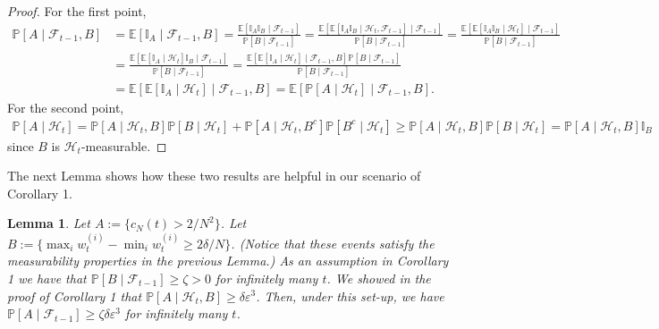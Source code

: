 \documentclass{article}
\newtheorem{lemma}{Lemma}
\newcommand{\PR}{\mathbb{P}}
\newcommand{\E}{\mathbb{E}}
\newcommand{\1}[1]{\mathbb{I}_{#1}}
\begin{document}
\begin{proof}
For the first point,
\begin{align*}
\PR[A \mid \mathcal{F}_{t-1}, B] 
&= \E[ \1{A} \mid \mathcal{F}_{t-1}, B]
= \frac{\E[ \1{A} \1{B} \mid \mathcal{F}_{t-1}]}{\PR[B \mid \mathcal{F}_{t-1}]}
=\frac{\E[ \E[ \1{A} \1{B} \mid \mathcal{H}_t, \mathcal{F}_{t-1} ] \mid \mathcal{F}_{t-1}]}{\PR[B \mid \mathcal{F}_{t-1}]}
=\frac{\E[ \E[ \1{A} \1{B} \mid \mathcal{H}_t ] \mid \mathcal{F}_{t-1}]}{\PR[B \mid \mathcal{F}_{t-1}]}\\
&=\frac{\E[ \E[ \1{A} \mid \mathcal{H}_t ] \1{B} \mid \mathcal{F}_{t-1}]}{\PR[B \mid \mathcal{F}_{t-1}]}
=\frac{\E[ \E[ \1{A} \mid \mathcal{H}_t ] \mid \mathcal{F}_{t-1}, B ] \PR[B \mid \mathcal{F}_{t-1}]}{\PR[B \mid \mathcal{F}_{t-1}]} \\
&=\E[ \E[ \1{A} \mid \mathcal{H}_t ] \mid \mathcal{F}_{t-1}, B ] 
=\E[ \PR[ A \mid \mathcal{H}_t] \mid \mathcal{F}_{t-1}, B ].
\end{align*}
For the second point,
\begin{align*}
\PR[A \mid \mathcal{H}_t] 
=  \PR[ A \mid \mathcal{H}_t, B] \PR[B \mid \mathcal{H}_t]
+ \PR[ A \mid \mathcal{H}_t, B^c] \PR[B^c \mid \mathcal{H}_t]
\geq  \PR[ A \mid \mathcal{H}_t, B] \PR[B \mid \mathcal{H}_t]
=  \PR[ A \mid \mathcal{H}_t, B] \1{B}
\end{align*}
since $B$ is $\mathcal{H}_t$-measurable.
\end{proof}

The next Lemma shows how these two results are helpful in our scenario of Corollary 1.

\begin{lemma}
Let $A := \{ c_N(t) > 2/N^2 \}$. Let $B:= \{ \max_i w_t^{(i)} - \min_i w_t^{(i)} \geq 2\delta/N \}$. (Notice that these events satisfy the measurability properties in the previous Lemma.)
As an assumption in Corollary 1 we have that $\PR[B \mid \mathcal{F}_{t-1}] \geq \zeta >0$ for infinitely many $t$.
We showed in the proof of Corollary 1 that $\PR[A \mid \mathcal{H}_t, B] \geq \delta\varepsilon^3$.
Then, under this set-up, we have
$\PR[A \mid \mathcal{F}_{t-1}] \geq \zeta\delta\varepsilon^3$ for infinitely many $t$.
\end{lemma}
\end{document}
